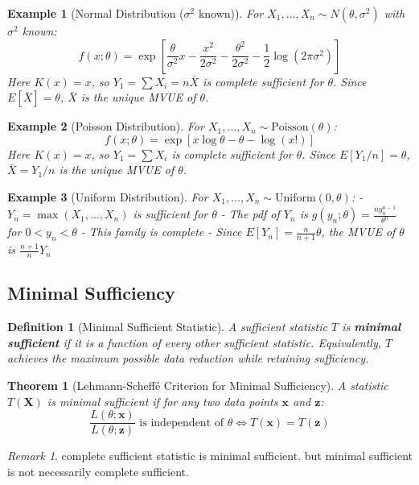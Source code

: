 \documentclass[12pt,a4paper]{amsart}
\newtheorem{theorem}{Theorem}[section]
\newtheorem{definition}{Definition}[section]
\newtheorem{example}{Example}[section]
\theoremstyle{remark}
\newtheorem{remark}{Remark}[section]
\begin{document}
\begin{example}[Normal Distribution ($\sigma^2$ known)]
For $X_1, \ldots, X_n \sim N(\theta, \sigma^2)$ with $\sigma^2$ known:
$$f(x; \theta) = \exp\left[\frac{\theta}{\sigma^2}x - \frac{x^2}{2\sigma^2} - \frac{\theta^2}{2\sigma^2} - \frac{1}{2}\log(2\pi\sigma^2)\right]$$
Here $K(x) = x$, so $Y_1 = \sum X_i = n\bar{X}$ is complete sufficient for $\theta$.
Since $E[\bar{X}] = \theta$, $\bar{X}$ is the unique MVUE of $\theta$.
\end{example}

\begin{example}[Poisson Distribution]
For $X_1, \ldots, X_n \sim \text{Poisson}(\theta)$:
$$f(x; \theta) = \exp[x\log\theta - \theta - \log(x!)]$$
Here $K(x) = x$, so $Y_1 = \sum X_i$ is complete sufficient for $\theta$.
Since $E[Y_1/n] = \theta$, $\bar{X} = Y_1/n$ is the unique MVUE of $\theta$.
\end{example}

\begin{example}[Uniform Distribution]
For $X_1, \ldots, X_n \sim \text{Uniform}(0, \theta)$:
- $Y_n = \max(X_1, \ldots, X_n)$ is sufficient for $\theta$
- The pdf of $Y_n$ is $g(y_n; \theta) = \frac{ny_n^{n-1}}{\theta^n}$ for $0 < y_n < \theta$
- This family is complete
- Since $E[Y_n] = \frac{n}{n+1}\theta$, the MVUE of $\theta$ is $\frac{n+1}{n}Y_n$
\end{example}

\subsection{Minimal Sufficiency}

\begin{definition}[Minimal Sufficient Statistic]
A sufficient statistic $T$ is \textbf{minimal sufficient} if it is a function of every other sufficient statistic. Equivalently, $T$ achieves the maximum possible data reduction while retaining sufficiency.
\end{definition}

\begin{theorem}[Lehmann-Scheffé Criterion for Minimal Sufficiency]
A statistic $T(\mathbf{X})$ is minimal sufficient if for any two data points $\mathbf{x}$ and $\mathbf{z}$:
$$\frac{L(\theta; \mathbf{x})}{L(\theta; \mathbf{z})} \text{ is independent of } \theta \Leftrightarrow T(\mathbf{x}) = T(\mathbf{z})$$
\end{theorem}

\begin{remark}
   complete sufficient statistic is minimal sufficient. but minimal sufficient is not necessarily complete sufficient.
\end{remark}
\end{document}
